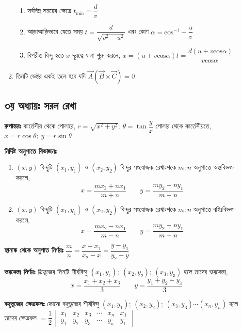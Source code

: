 \documentclass[a4paper,12pt]{article}
\newcommand{\tm}{\item}
\begin{document}
\begin{enumerate}[ wide=0em, label=\textenglish{\textbf{ \arabic* .}}, itemsep=0pt, parsep=1ex]
\begin{enumerate}
        \item  সর্বনিম্ন সময়ের ক্ষেত্রে $t_{{\mathrm{min}}}=\dfrac{d}{v}$

        \item  আড়াআড়িভাবে যেতে সময় $t=\dfrac{d}{\sqrt{v^2-u^2}}$ এবং কোণ $\alpha ={{\mathrm{cos}}^{\mathrm{-}\mathrm{1}} -\dfrac{u}{v}\ }$

        \item  বিপরীত বিন্দু হতে $x$ দূরত্বে যাত্রা শুরু করলে, $x=\left(u+v{\mathrm{cos} \alpha }\right)t=\dfrac{d\left(u+v{\mathrm{cos} \alpha }\right)}{v{\mathrm{cos} \alpha \ }}$
    \end{enumerate}

    \item  তিনটি ভেক্টর একই তলে হবে যদি $\overrightarrow{A}\left(\overrightarrow{B}\times \overrightarrow{C}\right)=0$
\end{enumerate}

\subsection{৩য় অধ্যায়ঃ সরল রেখা}

\textbf{রুপান্তরঃ} কার্তেসীয় থেকে পোলারে, $r=\sqrt{x^2+y^2}; \ \theta = \tan \dfrac{y}{x}$ পোলার থেকে কার্তেসীয়তে, $x=r \cos \theta; \ y=r\sin \theta$

\textbf{নির্দিষ্ট অনুপাতে বিভাজনঃ} \begin{enumerate}[ wide=0em, label=\textenglish{\textbf{ \arabic* .}}, itemsep=0pt, parsep=1ex]
    \tm $(x,y)$ বিন্দুটি $(x_1,y_1)$ ও $(x_2,y_2)$ বিন্দুর সংযোজক রেখাংশকে $m:n$ অনুপাতে অন্তবিভক্ত করলে, 
    \[x= \frac{mx_2+nx_1}{m+n} \qquad y = \frac{my_2+ny_1}{m+n}\]
    \tm $(x,y)$ বিন্দুটি $(x_1,y_1)$ ও $(x_2,y_2)$ বিন্দুর সংযোজক রেখাংশকে $m:n$ অনুপাতে বহিঃবিভক্ত করলে, 
    \[x= \frac{mx_2-nx_1}{m-n} \qquad y = \frac{my_2-ny_1}{m-n}\] 
\end{enumerate}

\textbf{স্থানাঙ্ক থেকে অনুপাত নির্ণয়ঃ}  $\dfrac{m}{n}=\dfrac{x-x_1}{x_2-x}=\dfrac{y-y_1}{y_2-y}$ 

\textbf{ভরকেন্দ্র নির্ণয়ঃ} ত্রিভূজের তিনটি শীর্ষবিন্দু $(x_1,y_1); \ (x_2,y_2); \ (x_3,y_3)$ হলে তাদের ভরকেন্দ্র, \[x=\frac{x_1+x_2+x_3}{3} \qquad y=\frac{y_1+y_2+y_3}{3}\]

\textbf{বহুভূজের ক্ষেত্রফলঃ} কোনো বহুভুজের শীর্ষবিন্দু $(x_1,y_1); \ (x_2,y_2); \ (x_3,y_3) \cdots (x_n, y_n)$ হলে তাদের ক্ষেত্রফল $=\dfrac{1}{2} \begin{vmatrix}
    x_1 & x_2 & x_3 & \cdots & x_n & x_1\\
    y_1 & y_2 & y_3 & \cdots & y_n & y_1
\end{vmatrix}$
\end{document}
